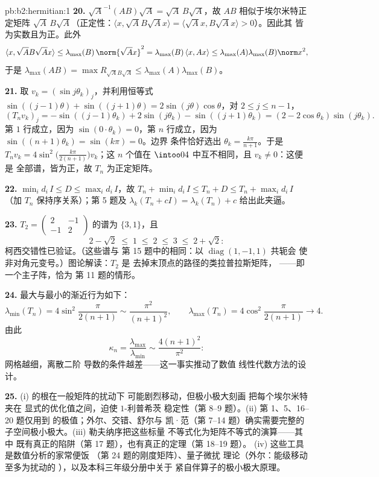 \begin{solution}{pb:b2:hermitian:1}
\textbf{20.} $\sqrt A^{-1}(AB)\sqrt A = \sqrt A\,B\sqrt A$，故
$AB$ 相似于埃尔米特正定矩阵 $\sqrt
A\,B\sqrt A$（正定性：$\langle x, \sqrt AB\sqrt Ax\rangle =
\langle \sqrt Ax, B\sqrt Ax\rangle > 0$）。因此其
皆为实数且为正。此外
\[
\langle x, \sqrt AB\sqrt Ax\rangle
\leq \lambda_{\max}(B)\,\norm{\sqrt Ax}^2
= \lambda_{\max}(B)\,\langle x, Ax\rangle
\leq \lambda_{\max}(A)\lambda_{\max}(B)\norm x^2 ,
\]
于是 $\lambda_{\max}(AB) = \max R_{\sqrt AB\sqrt A} \leq
\lambda_{\max}(A)\lambda_{\max}(B)$。

\textbf{21.} 取 $v_k = (\sin j\theta_k)_j$，并利用恒等式
$\sin((j-1)\theta) + \sin((j+1)\theta) =
2\sin(j\theta)\cos\theta$，对 $2 \leq j \leq n-1$，
\[
(T_nv_k)_j = -\sin((j{-}1)\theta_k) + 2\sin(j\theta_k) -
\sin((j{+}1)\theta_k)
= (2 - 2\cos\theta_k)\sin(j\theta_k) .
\]
第 $1$ 行成立，因为 $\sin(0\cdot\theta_k) = 0$，第 $n$
行成立，因为 $\sin((n+1)\theta_k) = \sin(k\pi) = 0$。边界
条件恰好选出 $\theta_k = \frac{k\pi}{n+1}$。于是
$T_nv_k = 4\sin^2\bigl(\frac{k\pi}{2(n+1)}\bigr)v_k$；这 $n$
个值在 $\intoo04$ 中互不相同，且 $v_k \neq 0$：这便是
全部谱，皆为正，故 $T_n$ 为正定矩阵。

\textbf{22.} $\min_id_i\,I \leq D \leq \max_id_i\,I$，故 $T_n +
\min_id_i\,I \leq T_n + D \leq T_n + \max_id_i\,I$
（加 $T_n$ 保持序关系）；第 5 题及
$\lambda_k(T_n + cI) = \lambda_k(T_n) + c$ 给出此夹逼。

\textbf{23.} $T_2 = \begin{pmatrix} 2 & -1\\ -1 &
2\end{pmatrix}$ 的谱为 $\{3, 1\}$，且
\[
2 - \sqrt2 \;\leq\; 1 \;\leq\; 2 \;\leq\; 3 \;\leq\; 2 +
\sqrt2 :
\]
柯西交错性已验证。（这些谱与
第 15 题中的相同：以 $\operatorname{diag}(1,-1,1)$ 共轭会
使非对角元变号。）图论解读：$T_2$ 是
去掉末顶点的路径的类拉普拉斯矩阵，
——即一个主子阵，恰为
第 11 题的情形。

\textbf{24.} 最大与最小的渐近行为如下：
\[
\lambda_{\min}(T_n) = 4\sin^2\frac{\pi}{2(n+1)}
\sim \frac{\pi^2}{(n+1)^2},
\qquad
\lambda_{\max}(T_n) = 4\cos^2\frac{\pi}{2(n+1)}
\longrightarrow 4 .
\]
由此
\[
\kappa_n = \frac{\lambda_{\max}}{\lambda_{\min}}
\sim \frac{4(n+1)^2}{\pi^2} :
\]
网格越细，离散二阶
导数的条件越差——这一事实推动了数值
线性代数方法的设计。

\textbf{25.} (i) 的根在一般矩阵的扰动下
可能剧烈移动，但极小极大刻画
把每个埃尔米特夹在
显式的优化值之间，迫使 $1$-利普希茨
稳定性（第 8--9 题）。(ii) 第 1、5、16--20 题仅用到
的极值；外尔、交错、舒尔与
凯·范（第 7--14 题）确实需要完整的
子空间极小极大。(iii) 勒夫纳序把这些标量
不等式化为矩阵不等式的演算——其中
既有真正的陷阱（第 17 题），也有真正的定理（第 18--19 题）。
(iv) 这些工具是数值分析的家常便饭
（第 24 题的刚度矩阵）、量子微扰
理论（外尔：能级移动至多为扰动的
），以及本科三年级分册中关于
紧自伴算子的极小极大原理。
\end{solution}
